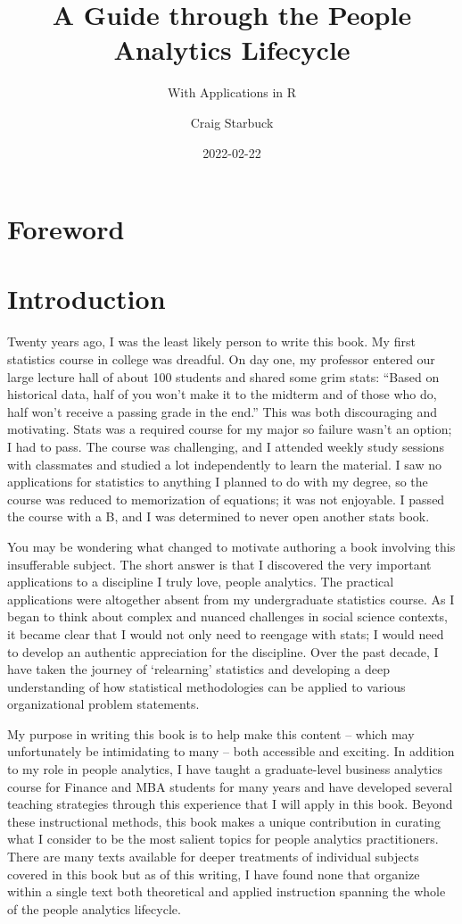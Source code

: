 \documentclass[]{book}
\title{A Guide through the People Analytics Lifecycle}
\subtitle{With Applications in R}
\author{Craig Starbuck}
\date{2022-02-22}
\begin{document}
\maketitle

{
\setcounter{tocdepth}{1}
\tableofcontents
}
\hypertarget{foreword}{%
\chapter{Foreword}\label{foreword}}

\hypertarget{intro}{%
\chapter{Introduction}\label{intro}}

Twenty years ago, I was the least likely person to write this book. My first statistics course in college was dreadful. On day one, my professor entered our large lecture hall of about 100 students and shared some grim stats: ``Based on historical data, half of you won't make it to the midterm and of those who do, half won't receive a passing grade in the end.'' This was both discouraging and motivating. Stats was a required course for my major so failure wasn't an option; I had to pass. The course was challenging, and I attended weekly study sessions with classmates and studied a lot independently to learn the material. I saw no applications for statistics to anything I planned to do with my degree, so the course was reduced to memorization of equations; it was not enjoyable. I passed the course with a B, and I was determined to never open another stats book.

You may be wondering what changed to motivate authoring a book involving this insufferable subject. The short answer is that I discovered the very important applications to a discipline I truly love, people analytics. The practical applications were altogether absent from my undergraduate statistics course. As I began to think about complex and nuanced challenges in social science contexts, it became clear that I would not only need to reengage with stats; I would need to develop an authentic appreciation for the discipline. Over the past decade, I have taken the journey of `relearning' statistics and developing a deep understanding of how statistical methodologies can be applied to various organizational problem statements.

My purpose in writing this book is to help make this content -- which may unfortunately be intimidating to many -- both accessible and exciting. In addition to my role in people analytics, I have taught a graduate-level business analytics course for Finance and MBA students for many years and have developed several teaching strategies through this experience that I will apply in this book. Beyond these instructional methods, this book makes a unique contribution in curating what I consider to be the most salient topics for people analytics practitioners. There are many texts available for deeper treatments of individual subjects covered in this book but as of this writing, I have found none that organize within a single text both theoretical and applied instruction spanning the whole of the people analytics lifecycle.
\end{document}
